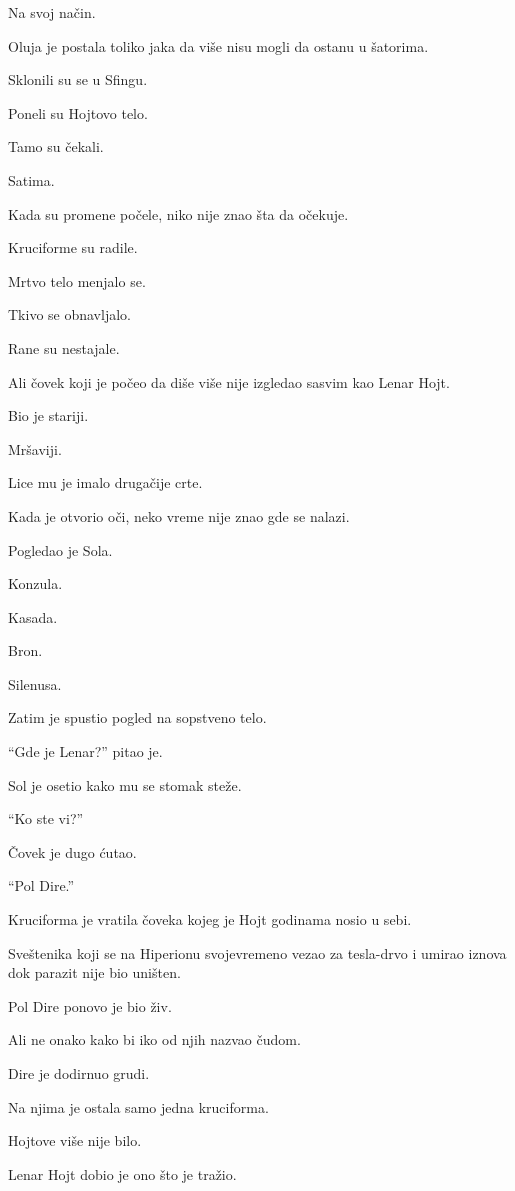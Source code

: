 Na svoj način.

\bigskip

Oluja je postala toliko jaka da više nisu mogli da ostanu u šatorima.

Sklonili su se u Sfingu.

Poneli su Hojtovo telo.

Tamo su čekali.

Satima.

Kada su promene počele, niko nije znao šta da očekuje.

Kruciforme su radile.

Mrtvo telo menjalo se.

Tkivo se obnavljalo.

Rane su nestajale.

Ali čovek koji je počeo da diše više nije izgledao sasvim kao Lenar Hojt.

Bio je stariji.

Mršaviji.

Lice mu je imalo drugačije crte.

Kada je otvorio oči, neko vreme nije znao gde se nalazi.

Pogledao je Sola.

Konzula.

Kasada.

Bron.

Silenusa.

Zatim je spustio pogled na sopstveno telo.

``Gde je Lenar?'' pitao je.

Sol je osetio kako mu se stomak steže.

``Ko ste vi?''

Čovek je dugo ćutao.

``Pol Dire.''

\bigskip

Kruciforma je vratila čoveka kojeg je Hojt godinama nosio u sebi.

Sveštenika koji se na Hiperionu svojevremeno vezao za tesla-drvo i umirao iznova dok parazit nije bio uništen.

Pol Dire ponovo je bio živ.

Ali ne onako kako bi iko od njih nazvao čudom.

Dire je dodirnuo grudi.

Na njima je ostala samo jedna kruciforma.

Hojtove više nije bilo.

Lenar Hojt dobio je ono što je tražio.

